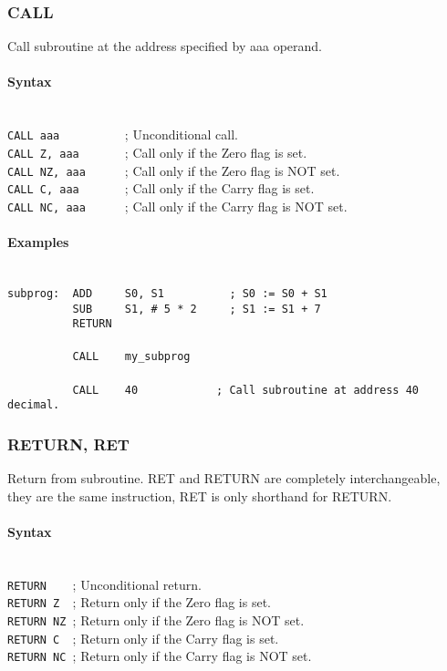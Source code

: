         \subsubsection{CALL}
            Call subroutine at the address specified by aaa operand.

            \paragraph{Syntax}
                ~\\
                \verb'CALL aaa          '; Unconditional call.\\
                \verb'CALL Z, aaa       '; Call only if the Zero flag is set.\\
                \verb'CALL NZ, aaa      '; Call only if the Zero flag is NOT set.\\
                \verb'CALL C, aaa       '; Call only if the Carry flag is set.\\
                \verb'CALL NC, aaa      '; Call only if the Carry flag is NOT set.

            \paragraph{Examples}
                ~\\
                \verb'subprog:  ADD     S0, S1          ; S0 := S0 + S1'\\
                \verb'          SUB     S1, # 5 * 2     ; S1 := S1 + 7'\\
                \verb'          RETURN'\\
                \verb''\\
                \verb'          CALL    my_subprog'\\
                \verb''\\
                \verb'          CALL    40            ; Call subroutine at address 40 decimal.'

        \subsubsection{RETURN, RET}
            Return from subroutine. RET and RETURN are completely interchangeable, they are the same instruction, RET is only shorthand for RETURN.

            \paragraph{Syntax}
                ~\\
                \verb'RETURN    '; Unconditional return.\\
                \verb'RETURN Z  '; Return only if the Zero flag is set.\\
                \verb'RETURN NZ '; Return only if the Zero flag is NOT set.\\
                \verb'RETURN C  '; Return only if the Carry flag is set.\\
                \verb'RETURN NC '; Return only if the Carry flag is NOT set.

